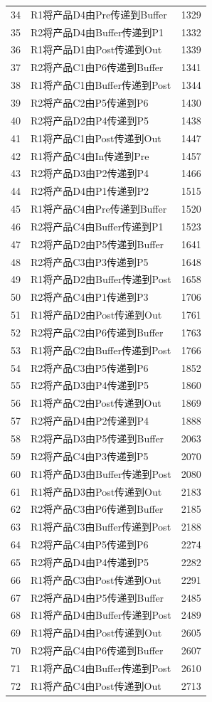 \documentclass{ctexart}
\begin{document}
{{\begin{longtable}{clc}
34 & R1将产品D4由Pre传递到Buffer & 1329 \\
35 & R2将产品D4由Buffer传递到P1 & 1332 \\
36 & R1将产品D1由Post传递到Out & 1339 \\
37 & R2将产品C1由P6传递到Buffer & 1341 \\
38 & R1将产品C1由Buffer传递到Post & 1344 \\
39 & R2将产品C2由P5传递到P6 & 1430 \\
40 & R2将产品D2由P4传递到P5 & 1438 \\
41 & R1将产品C1由Post传递到Out & 1447 \\
42 & R1将产品C4由In传递到Pre & 1457 \\
43 & R2将产品D3由P2传递到P4 & 1466 \\
44 & R2将产品D4由P1传递到P2 & 1515 \\
45 & R1将产品C4由Pre传递到Buffer & 1520 \\
46 & R2将产品C4由Buffer传递到P1 & 1523 \\
47 & R2将产品D2由P5传递到Buffer & 1641 \\
48 & R2将产品C3由P3传递到P5 & 1648 \\
49 & R1将产品D2由Buffer传递到Post & 1658 \\
50 & R2将产品C4由P1传递到P3 & 1706 \\
51 & R1将产品D2由Post传递到Out & 1761 \\
52 & R2将产品C2由P6传递到Buffer & 1763 \\
53 & R1将产品C2由Buffer传递到Post & 1766 \\
54 & R2将产品C3由P5传递到P6 & 1852 \\
55 & R2将产品D3由P4传递到P5 & 1860 \\
56 & R1将产品C2由Post传递到Out & 1869 \\
57 & R2将产品D4由P2传递到P4 & 1888 \\
58 & R2将产品D3由P5传递到Buffer & 2063 \\
59 & R2将产品C4由P3传递到P5 & 2070 \\
60 & R1将产品D3由Buffer传递到Post & 2080 \\
61 & R1将产品D3由Post传递到Out & 2183 \\
62 & R2将产品C3由P6传递到Buffer & 2185 \\
63 & R1将产品C3由Buffer传递到Post & 2188 \\
64 & R2将产品C4由P5传递到P6 & 2274 \\
65 & R2将产品D4由P4传递到P5 & 2282 \\
66 & R1将产品C3由Post传递到Out & 2291 \\
67 & R2将产品D4由P5传递到Buffer & 2485 \\
68 & R1将产品D4由Buffer传递到Post & 2489 \\
69 & R1将产品D4由Post传递到Out & 2605 \\
70 & R2将产品C4由P6传递到Buffer & 2607 \\
71 & R1将产品C4由Buffer传递到Post & 2610 \\
72 & R1将产品C4由Post传递到Out & 2713 \\
 	

\end{longtable}}}
\end{document}
